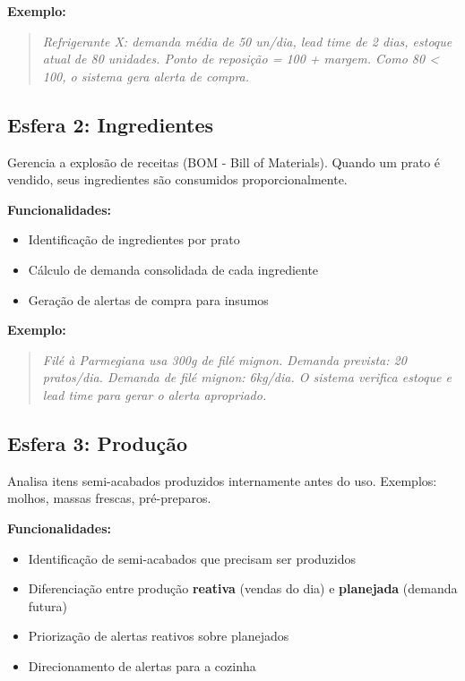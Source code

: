 \textbf{Exemplo:}

\begin{quote}
\textit{Refrigerante X: demanda média de 50 un/dia, lead time de 2 dias,
estoque atual de 80 unidades. Ponto de reposição = 100 + margem.
Como 80 < 100, o sistema gera alerta de compra.}
\end{quote}

\subsection{Esfera 2: Ingredientes}

Gerencia a explosão de receitas (BOM - Bill of Materials).
Quando um prato é vendido, seus ingredientes são consumidos proporcionalmente.

\textbf{Funcionalidades:}

\begin{itemize}[leftmargin=2em]
  \item Identificação de ingredientes por prato
  \item Cálculo de demanda consolidada de cada ingrediente
  \item Geração de alertas de compra para insumos
\end{itemize}

\textbf{Exemplo:}

\begin{quote}
\textit{Filé à Parmegiana usa 300g de filé mignon. Demanda prevista: 20 pratos/dia.
Demanda de filé mignon: 6kg/dia. O sistema verifica estoque e lead time
para gerar o alerta apropriado.}
\end{quote}

\subsection{Esfera 3: Produção}

Analisa itens semi-acabados produzidos internamente antes do uso.
Exemplos: molhos, massas frescas, pré-preparos.

\textbf{Funcionalidades:}

\begin{itemize}[leftmargin=2em]
  \item Identificação de semi-acabados que precisam ser produzidos
  \item Diferenciação entre produção \textbf{reativa} (vendas do dia) e
        \textbf{planejada} (demanda futura)
  \item Priorização de alertas reativos sobre planejados
  \item Direcionamento de alertas para a cozinha
\end{itemize}

